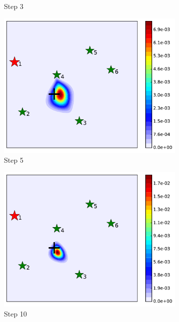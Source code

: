 \documentclass[journal]{IEEEtranTIE}
\theoremstyle{remark}
\begin{document}
\begin{figure}
\begin{subfigure}[b]{0.21\textwidth}
			\caption{Step 3}\label{fig:sta_sen_sta_tar_sing2}
		\end{subfigure}
		\begin{subfigure}[b]{0.21\textwidth}
			\includegraphics[width=\textwidth]{brg_sta_sen_sta_tar_rbt1_step5_16-TIE-3798}
			\caption{Step 5}\label{fig:sta_sen_sta_tar_sing3}
		\end{subfigure}
		\begin{subfigure}[b]{0.21\textwidth}
			\includegraphics[width=\textwidth]{brg_sta_sen_sta_tar_rbt1_step10_16-TIE-3798}
			\caption{Step 10}\label{fig:sta_sen_sta_tar_sing4}
		\end{subfigure}
		\begin{subfigure}[b]{0.21\textwidth}

\end{subfigure}
\end{figure}
\end{document}
